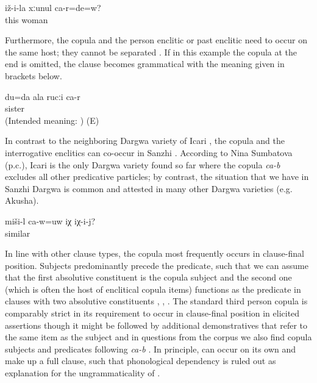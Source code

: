 %
\begin{exe}
	\ex	\label{ex:‎‎‎Are you his wife}
	\gll	iž-i-la	xːunul	ca-r=de=w?\\
		this	woman	\\
	\glt	{}
\end{exe}

Furthermore, the copula and the person enclitic or past enclitic need to occur on the same host; they cannot be separated . If in this example the copula at the end is omitted, the clause becomes grammatical with the meaning given in brackets below. 
%
\begin{exe}
	\ex	\label{ex:It is me who is your sister.}
	\gll	*du=da	ala	rucːi	ca-r\\
				sister	\\
	\glt	(Intended meaning: ) (E)
\end{exe}

In contrast to the neighboring Dargwa variety of Icari \citep[138]{Sumbatova.Mutalov2003}, the copula and the interrogative enclitics can co-occur in Sanzhi . According to Nina Sumbatova (p.c.), Icari is the only Dargwa variety found so far where the copula \textit{ca-b} excludes all other predicative particles; by contrast, the situation that we have in Sanzhi Dargwa is common and attested in many other Dargwa varieties (e.g. Akusha). 

\begin{exe}
	\ex	\label{ex:Is this similar to him}
	\gll	miši-l	ca-w=uw	iχ	iχ-i-j?\\
		similar		\tsc{dem.down}	\\
	\glt	{}
\end{exe}

In line with other clause types, the copula most frequently occurs in clause-final position. Subjects predominantly precede the predicate, such that we can assume that the first absolutive constituent is the copula subject and the second one (which is often the host of enclitical copula items) functions as the predicate in clauses with two absolutive constituents , , . The standard third person copula  is comparably strict in its requirement to occur in clause-final position in elicited assertions  though it might be followed by additional demonstratives that refer to the same item as the subject and in questions from the corpus we also find copula subjects and predicates following \textit{ca-b} . In principle,  can occur on its own and make up a full clause, such that phonological dependency is ruled out as explanation for the ungrammaticality of . 


